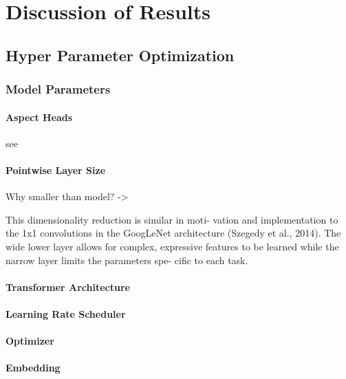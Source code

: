 \chapter{Discussion of Results}
\label{ch:discussion}


\section{Hyper Parameter Optimization}

\subsection{Model Parameters}

\subsubsection{Aspect Heads}

see \cite{Ramsundar2015}

\subsubsection{Pointwise Layer Size}

Why smaller than model? -> 

This dimensionality reduction is similar in moti- vation and implementation to the 1x1 convolutions in the GoogLeNet architecture (Szegedy et al., 2014). The wide lower layer allows for complex, expressive features to be learned while the narrow layer limits the parameters spe- cific to each task.

\cite{Ramsundar2015}

\subsubsection{Transformer Architecture}

\subsubsection{Learning Rate Scheduler}

\subsubsection{Optimizer}

\subsubsection{Embedding}


